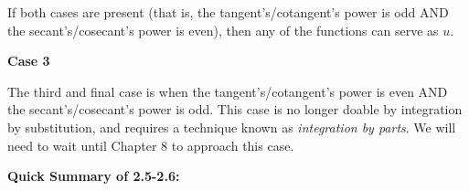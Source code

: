 If both cases are present (that is, the tangent's/cotangent's power is odd AND the secant's/cosecant's power is even), then any of the functions can serve as $u$. \par

\textbf{Case 3} \par

The third and final case is when the tangent's/cotangent's power is even AND the secant's/cosecant's power is odd. This case is no longer doable by integration by substitution, and requires a technique known as \textit{integration by parts}. We will need to wait until Chapter 8 to approach this case.

\bigskip

\textbf{\large{Quick Summary of 2.5-2.6:}} \par

